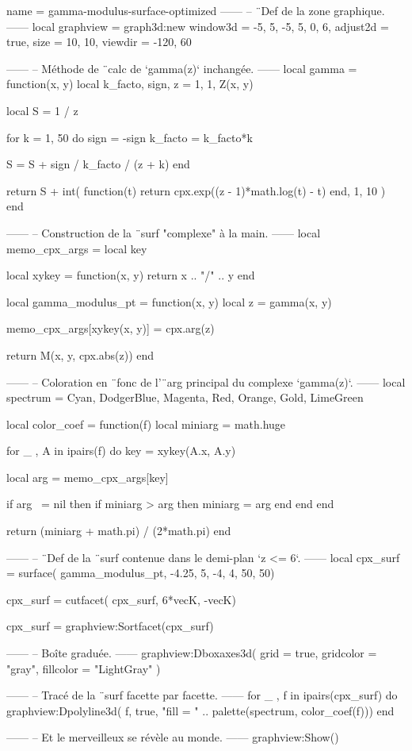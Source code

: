 \documentclass{standalone}
\begin{document}
\begin{luadraw}{name = gamma-modulus-surface-optimized}
------
-- ¨Def de la zone graphique.
------
local graphview = graph3d:new{
  window3d = {-5, 5, -5, 5, 0, 6},
  adjust2d = true,
  size     = {10, 10},
  viewdir  = {-120, 60}
}

------
-- Méthode de ¨calc de `gamma(z)` inchangée.
------
local gamma = function(x, y)
  local k_facto, sign, z = 1, 1, Z(x, y)

  local S = 1 / z

  for k = 1, 50 do
    sign    = -sign
    k_facto = k_facto*k

    S = S + sign / k_facto / (z + k)
  end

  return S + int(
    function(t)
      return cpx.exp((z - 1)*math.log(t) - t)
    end,
    1, 10
  )
end

------
-- Construction de la ¨surf "complexe" à la main.
------
local memo_cpx_args = {}
local key

local xykey = function(x, y)
    return x .. "/" .. y
end

local gamma_modulus_pt = function(x, y)
  local z = gamma(x, y)

  memo_cpx_args[xykey(x, y)] = cpx.arg(z)

  return M(x, y, cpx.abs(z))
end

------
-- Coloration en ¨fonc de l'¨arg principal du complexe `gamma(z)`.
------
local spectrum = {Cyan, DodgerBlue, Magenta, Red, Orange, Gold, LimeGreen}

local color_coef = function(f)
  local miniarg = math.huge

  for _ , A in ipairs(f) do
    key = xykey(A.x, A.y)

    local arg = memo_cpx_args[key]

    if arg ~= nil then
      if miniarg > arg then
        miniarg = arg
      end
    end
  end

  return (miniarg + math.pi) / (2*math.pi)
end

------
-- ¨Def de la ¨surf contenue dans le demi-plan `z <= 6`.
------
local cpx_surf = surface(
  gamma_modulus_pt,
  -4.25, 5, -4, 4,
  {50, 50})

cpx_surf = cutfacet(
  cpx_surf,
  {6*vecK, -vecK})

cpx_surf = graphview:Sortfacet(cpx_surf)

------
-- Boîte graduée.
------
graphview:Dboxaxes3d({
  grid      = true,
  gridcolor = "gray",
  fillcolor = "LightGray"
})

------
-- Tracé de la ¨surf facette par facette.
------
for _ , f in ipairs(cpx_surf) do
  graphview:Dpolyline3d(
    f,
    true,
       "fill = "
    .. palette(spectrum, color_coef(f)))
end

------
-- Et le merveilleux se révèle au monde.
------
graphview:Show()
\end{luadraw}
\end{document}
